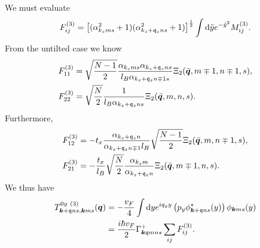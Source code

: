 We must evaluate
\begin{equation}
  \label{eq:152}
  F^{(3)}_{ij} = \left[(\alpha_{k_z m s}^2  + 1) ( \alpha_{k_z + \mathfrak{q}_z ns}^2 + 1 )\right]^{\frac{1}{2}} \int \mathrm{d} \tilde{y} e^{-\tilde{y}^2} M^{(3)}_{ij}.
\end{equation}
From the untilted case we know
\begin{align}
  F^{(3)}_{11} &= \sqrt{\frac{N-1}{2}}
                 \frac{\alpha_{k_z m s} \alpha_{k_z + \mathfrak{q}_z n s}}{l_{B} \alpha_{k_z + \mathfrak{q}_z n \mp 1 s}}
                 \Xi_2( \bar{\bm{q}}, m\mp 1, n\mp 1, s ),\\
  F^{(3)}_{22} &= \sqrt{\frac{N}{2}}
                 \frac{1}{l_{B} \alpha_{k_z + \mathfrak{q}_z n s}}
                 \Xi_{2} (\bar{\bm{q}}, m, n, s).
\end{align}
Furthermore,
\begin{align}
  F^{(3)}_{12} &= -t_x \frac{\alpha_{k_z + \mathfrak{q}_z n}}{\alpha_{k_z + \mathfrak{q}_z n \mp 1} l_{B}}
                 \sqrt{\frac{N-1}{2}}
                 \Xi_{2} (\bar{\bm{q}}, m, n \mp 1, s),\\
  F^{(3)}_{21} &= -\frac{t_x}{l_{B}}
                 \sqrt{\frac{N}{2}}
                 \frac{\alpha_{k_z m}}{\alpha_{k_z + \mathfrak{q}_z n}}
                 \Xi_2 ( \bar{\bm{q}}, m \mp 1, n, s ).
\end{align}
We thus have
\begin{align}
  \label{eq:153}
  T^{0y~(3)}_{\bm{k} + \mathfrak{q} ns, \bm{k} ms} (\bm{q})
  &= - \frac{v_F}{4}
    \int \mathrm{d} y
    e^{i q_y y}
    \left( p_y \phi ^{*}_{\bm{k} + \mathfrak{q} ns}(y) \right) \phi _{\bm{k} m s}(y)\\
  &= \frac{i \hbar v_F}{2}
    \Gamma ^{+}_{\bm{k} \mathfrak{q} m n s}
    \sum\limits_{ij}^{} F^{(3)}_{ij}.
\end{align}


